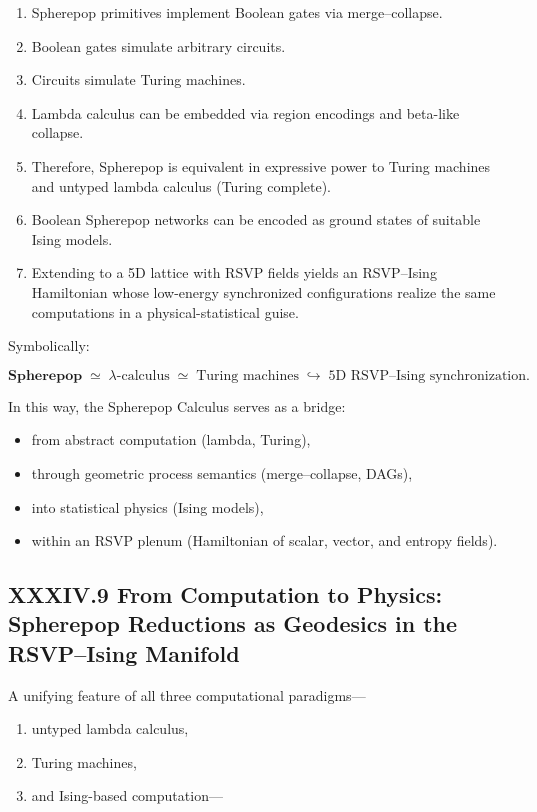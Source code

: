 \documentclass[12pt,letterpaper]{article}
\begin{document}
\begin{enumerate}
  \item Spherepop primitives implement Boolean gates via merge--collapse.
  \item Boolean gates simulate arbitrary circuits.
  \item Circuits simulate Turing machines.
  \item Lambda calculus can be embedded via region encodings and beta-like collapse.
  \item Therefore, Spherepop is equivalent in expressive power to Turing machines and untyped lambda calculus (Turing complete).
  \item Boolean Spherepop networks can be encoded as ground states of suitable Ising models.
  \item Extending to a 5D lattice with RSVP fields yields an RSVP--Ising Hamiltonian whose low-energy synchronized configurations realize the same computations in a physical-statistical guise.
\end{enumerate}

Symbolically:

\[
\boxed{
\textbf{Spherepop} \;\simeq\; \lambda\text{-calculus} \;\simeq\; \text{Turing machines}
\;\hookrightarrow\;
\text{5D RSVP--Ising synchronization}.
}
\]

In this way, the Spherepop Calculus serves as a bridge:

\begin{itemize}
  \item from abstract computation (lambda, Turing),
  \item through geometric process semantics (merge--collapse, DAGs),
  \item into statistical physics (Ising models),
  \item within an RSVP plenum (Hamiltonian of scalar, vector, and entropy fields).
\end{itemize}

\subsection{XXXIV.9 From Computation to Physics:  
Spherepop Reductions as Geodesics in the RSVP–Ising Manifold}

A unifying feature of all three computational paradigms—

\begin{enumerate}
    \item untyped lambda calculus,
    \item Turing machines,
    \item and Ising-based computation—
\end{enumerate}
\end{document}
